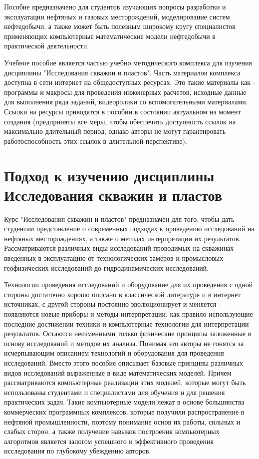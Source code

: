 \documentclass{memoir}
\begin{document}
Пособие предназначено для студентов изучающих вопросы разработки и эксплуатации нефтяных и газовых месторождений, моделирование систем нефтедобычи, а также может быть полезным широкому кругу специалистов применяющих компьютерные математические модели нефтедобычи в практической деятельности. 

Учебное пособие является частью учебно методического комплекса для изучения дисциплины "Исследования скважин и пластов". Часть материалов комплекса доступна в сети интернет на общедоступных ресурсах. Это такие материалы как - программы и макросы для проведения инженерных расчетов, исходные данные для выполнения ряда заданий, видеоролики со вспомогательными материалами. Ссылки на ресурсы приводятся в пособии в состоянии актуальном на момент создания (предприняты все меры, чтобы обеспечить доступность ссылок на максимально длительный период, однако авторы не могут гарантировать работоспособность этих ссылок в длительной перспективе).




\section{Подход к изучению дисциплины Исследования скважин и пластов}
Курс "Исследования скважин и пластов" предназначен для того, чтобы дать студентам представление о современных подходах к проведению исследований на нефтяных месторождениях, а также о методах интерпретации их результатов. Рассматриваются различных виды исследований проводимых на скважинах введенных в эксплуатацию от технологических замеров и промысловых геофизических исследований до гидродинамических исследований.

Технологии проведения исследований и оборудование для их проведения с одной стороны достаточно хорошо описано в классической литературе и в интернет источниках, с другой стороны постоянно эволюционирует и меняется - появляются новые приборы и методы интерпретации, как правило использующие последние достижении техники и компьютерные технологии для интерпретации результатов. Остаются неизменными только физические принципы заложенные в основу исследований и методов их анализа. Понимая это авторы не гонятся за исчерпывающим описанием технологий и оборудования для проведения исследований. Вместо этого пособие описывает базовые принципы различных видов исследований выраженные в виде математических моделей. Причем рассматриваются компьютерные реализации этих моделей, которые могут быть использованы студентами и специалистами для обучения и для решения практических задач. Такие компьютерные модели лежат в основе большинства коммерческих программных комплексов, которые получили распространение в нефтяной промышленности, поэтому понимание основ их работы, сильных и слабых сторон, а также получение навыков построения компьютерных алгоритмов является залогом успешного и эффективного проведения исследования по глубокому убеждению авторов.
\end{document}
